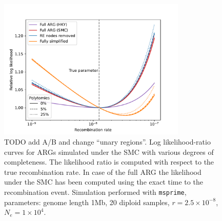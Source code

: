 \documentclass{article}
\begin{document}
\begin{figure}
    \centering
    \includegraphics[width=0.8\textwidth]{figures/likelihood_surface}
    \caption{TODO add A/B and change ``unary regions''.
    Log likelihood-ratio curves for ARGs simulated under the SMC with
    various degrees of completeness. The likelihood ratio is computed with
    respect to the true recombination rate. In case of the full ARG the likelihood
    under the SMC has been computed using the exact time to the recombination event.
    Simulation performed with \texttt{msprime}, parameters:
    genome length 1Mb, 20 diploid samples,
    $r=2.5\times10^{-8}$, $N_e=1\times10^4$.}
    \label{fig:lik-surface}
\end{figure}
\end{document}

